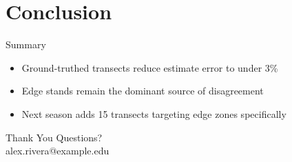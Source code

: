 \documentclass{beamer}
\begin{document}
\section{Conclusion}

\begin{frame}{Summary}
  \begin{itemize}
    \item Ground-truthed transects reduce estimate error to under 3\%
    \item Edge stands remain the dominant source of disagreement
    \item Next season adds 15 transects targeting edge zones specifically
  \end{itemize}
\end{frame}

\begin{frame}{Thank You}
  \centering
  \Large Questions?\\[1em]
  \normalsize alex.rivera@example.edu
\end{frame}
\end{document}

